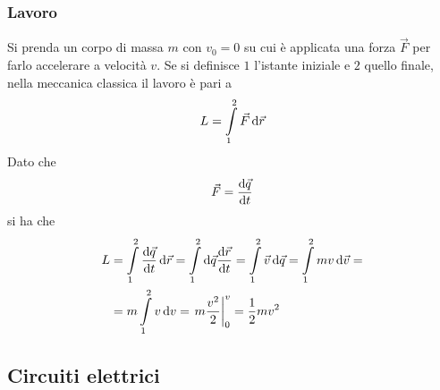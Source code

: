 \subsubsection{Lavoro}
Si prenda un corpo di massa $m$ con $v_0=0$ su cui è applicata una forza $\vec{F}$ per farlo
accelerare a velocità $v$. Se si definisce $1$ l'istante iniziale e $2$ quello finale, nella
meccanica classica il lavoro è pari a
\begin{equation*}
  L = \int\limits_{1}^{2} \vec{F}\mathop{}\!\mathrm{d}\vec{r}
\end{equation*}
Dato che
\begin{equation*}
  \vec{F} = \frac{\mathop{}\!\mathrm{d} \vec{q}}{\mathop{}\!\mathrm{d} t}
\end{equation*}
si ha che
\begin{align*}
  L &= \int\limits_{1}^{2} \der{\vec{q}}{t}\dif\vec{r}=
  \int\limits_{1}^{2}\dif\vec{q}\der{\vec{r}}{t}=\int\limits_{1}^{2} \vec{v}\dif\vec{q}=
  \int\limits_{1}^{2} mv\dif\vec{v}=\\
  &=m \int\limits_{1}^{2} v\dif v=
  \left.m \frac{v^2}{2}\right|_0^v=\frac{1}{2}mv^2
\end{align*}

\subsection{Circuiti elettrici}

